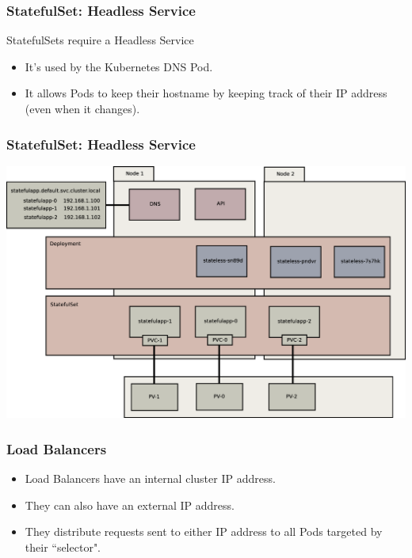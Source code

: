     \begin{frame}
        \frametitle{StatefulSet: Headless Service}
        StatefulSets require a Headless Service
        \begin{itemize}
            \item It's used by the Kubernetes DNS Pod.\pause
            \item It allows Pods to keep their hostname by keeping track of their IP address (even when it changes).
        \end{itemize}
    \end{frame}

    \begin{frame}
        \frametitle{StatefulSet: Headless Service}
        \includegraphics[width=\textwidth,height=0.85\textheight,keepaspectratio]{graphics/07-persistentIdentity.eps}
    \end{frame}

    \begin{frame}
        \frametitle{Load Balancers}
        \begin{itemize}
            \item Load Balancers have an internal cluster IP address.\pause
            \item They can also have an external IP address.\pause
            \item They distribute requests sent to either IP address to all Pods targeted by their ``selector".
        \end{itemize}
    \end{frame}


